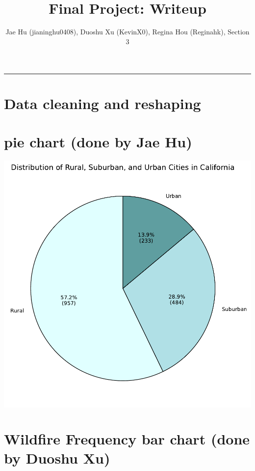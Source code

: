 \documentclass[
  letterpaper,
  DIV=11,
  numbers=noendperiod]{scrartcl}
\title{Final Project: Writeup}
\author{Jae Hu (jianinghu0408), Duoshu Xu (KevinX0), Regina Hou
(Reginahk), Section 3}
\date{}
\begin{document}
\maketitle



\begin{center}\rule{0.5\linewidth}{0.5pt}\end{center}

\section{Data cleaning and reshaping}\label{data-cleaning-and-reshaping}

\section{pie chart (done by Jae Hu)}\label{pie-chart-done-by-jae-hu}

\includegraphics{Final Writeup_files/figure-pdf/cell-6-output-1.pdf}

\section{Wildfire Frequency bar chart (done by Duoshu
Xu)}\label{wildfire-frequency-bar-chart-done-by-duoshu-xu}
\end{document}
